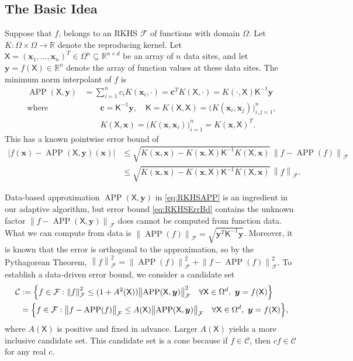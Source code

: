 \documentclass[]{mcom-l}
\theoremstyle{remark}
\DeclareMathOperator{\APP}{APP}
\newcommand{\reals}{{\mathbb{R}}}
\newcommand{\mK}{\mathsf{K}}
\newcommand{\mX}{\mathsf{X}}
\newcommand{\bc}{{\boldsymbol{c}}}
\newcommand{\bx}{{\boldsymbol{x}}}
\newcommand{\by}{{\boldsymbol{y}}}
\newcommand{\cx}{{\Omega}}
\newcommand{\calc}{{\mathcal{C}}}
\newcommand{\calf}{{\mathcal{F}}}
\def\abs#1{\ensuremath{\left \lvert #1 \right \rvert}}
\newcommand{\norm}[2][{}]{\ensuremath{\left \lVert #2 \right \rVert}_{#1}}
\newcommand{\bignorm}[2][{}]{\ensuremath{\bigl \lVert #2 \bigr \rVert}_{#1}}
\begin{document}
\subsection{The Basic Idea} \label{sec:basicIdea}
Suppose that $f$, belongs to an RKHS $\calf$ of functions with domain $\cx$.  Let $K: \Omega \times \Omega \to \reals$ denote the reproducing kernel.  Let $\mX = (\bx_1, \ldots, \bx_n)^T \in \cx^n \subseteq \reals^{n \times d}$ be an array of $n$ data sites, and let $\by  = f(\mX) \in \reals^n$ denote the array of function values at these data sites.  
The minimum norm interpolant of $f$ is 
\begin{subequations} \label{eq:RKHSAPP}
\begin{align} 
\APP(\mX,\by) &= \sum_{i=1}^n c_i K(\bx_i,\cdot) = \bc^T K(\mX,\cdot) =  K(\cdot, \mX) \mK^{-1} \by \, \\
 \text{where } & \qquad \bc = \mK^{-1} \by, \quad \mK = K(\mX,\mX) = \bigl( K(\bx_i,\bx_j) \bigr)_{i,j=1}^n,  \\
& \qquad  K(\mX,\bx) = \bigl(K(\bx,\bx_i) \bigr)_{i=1}^n =  K(\bx, \mX)^T.
\end{align}
\end{subequations}
This has a known pointwise error bound of
\begin{align}
\label{eq:RKHSErrBd}
\abs{f(\bx) - \APP(\mX,\by)(\bx)} & \le \sqrt{K(\bx,\bx) - K(\bx,\mX) \mK^{-1} K(\mX,\bx)} \, \bignorm[\calf]{f - \APP(f)} \\
\nonumber
& \le \sqrt{K(\bx,\bx) - K(\bx,\mX) \mK^{-1} K(\mX,\bx) } \, \norm[\calf]{f} .
\end{align}

Data-based approximation $\APP(\mX,\by)$ in \eqref{eq:RKHSAPP} is an ingredient in our adaptive algorithm, but error bound \eqref{eq:RKHSErrBd} contains the unknown factor $\norm[\calf]{f - \APP(\mX,\by)}$ does cannot be computed from function data.  What we can compute from data is $\bignorm[\calf]{\APP(f)} = \sqrt{\by^T \mK^{-1} \by}$.  Moreover, it is known that the error is orthogonal to the approximation, so by the Pythagorean Theorem,  $\norm[\calf]{f}^2  = \bignorm[\calf]{\APP(f)}^2 + \bignorm[\calf]{f - \APP(f)}^2$.  To establish a data-driven error bound, we consider a candidate set
\begin{align} \label{eq:RKHScone}
\calc &:= \Bigl\{f \in \calf : \norm[\calf]{f}^2 \le (1 + A^2(\mX)) \bignorm[\calf]{\APP(\mX,\by)}^2 \quad \forall \mX \in \Omega^d, \ \by = f(\mX) \Bigr \} \\
\nonumber
& = \Bigl \{f \in \calf : \bignorm[\calf]{f - \APP(f)} \le A(\mX) \bignorm[\calf]{\APP(\mX,\by)} \quad \forall \mX \in \Omega^d, \ \by = f(\mX) \Bigr \},
\end{align}
where $A(\mX)$ is positive and fixed in advance. Larger $A(\mX)$ yields a more inclusive candidate set.  This candidate set is a cone because if $f \in \calc$, then $c f \in \calc$ for any real $c$. 
\end{document}
